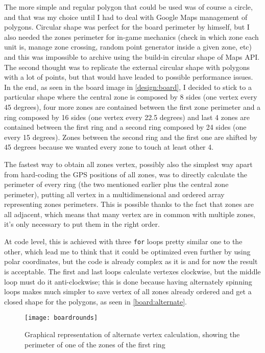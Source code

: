 			The more simple and regular polygon that could be used was of course a circle, and that was my choice until I had to deal with Google Maps management of polygons. Circular shape was perfect for the board perimeter by himself, but I also needed the zones perimeter for in-game mechanics (check in which zone each unit is, manage zone crossing, random point generator inside a given zone, etc) and this was impossible to archive using the build-in circular shape of Maps API.
			The second thought was to replicate the external circular shape with polygons with a lot of points, but that would have leaded to possible performance issues.
			In the end, as seen in the board image in \autoref{design:board}, I decided to stick to a particular shape where the central zone is composed by 8 sides (one vertex every 45 degrees), four more zones are contained between the first zone perimeter and a ring composed by 16 sides (one vertex every 22.5 degrees) and last 4 zones are contained between the first ring and a second ring composed by 24 sides (one every 15 degrees).
			Zones between the second ring and the first one are shifted by 45 degrees because we wanted every zone to touch at least other 4.
			
			The fastest way to obtain all zones vertex, possibly also the simplest way apart from hard-coding the GPS positions of all zones, was to directly calculate the perimeter of every ring (the two mentioned earlier plus the central zone perimeter), putting all vertex in a multidimensional and ordered array representing zones perimeters.
			This is possible thanks to the fact that zones are all adjacent, which means that many vertex are in common with multiple zones, it's only necessary to put them in the right order.
			
			At code level, this is achieved with three \lstinline|for| loops pretty similar one to the other, which lead me to think that it could be optimized even further by using polar coordinates, but the code is already complex as it is and for now the result is acceptable.
			The first and last loops calculate vertexes clockwise, but the middle loop must do it anti-clockwise; this is done because having alternately spinning loops makes much simpler to save vertex of all zones already ordered and get a closed shape for the polygons, as seen in \autoref{board:alternate}.
			
			\begin{figure}[htp]
				\centering
				\texttt{[image: boardrounds]}
				\caption{Graphical representation of alternate vertex calculation, showing the perimeter of one of the zones of the first ring}\label{board:alternate}
			\end{figure}
			

